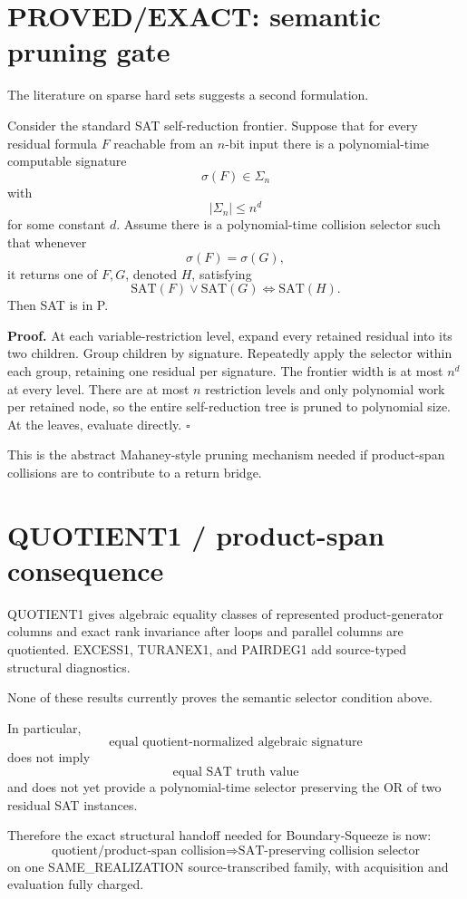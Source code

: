 \documentclass[11pt]{article}
\begin{document}
\section*{PROVED/EXACT: semantic pruning gate}
The literature on sparse hard sets suggests a second formulation.

Consider the standard SAT self-reduction frontier. Suppose that for every residual formula \(F\) reachable from an \(n\)-bit input there is a polynomial-time computable signature
\[
\sigma(F)\in\Sigma_n
\]
with
\[
|\Sigma_n|\le n^{d}
\]
for some constant \(d\). Assume there is a polynomial-time collision selector such that whenever
\[
\sigma(F)=\sigma(G),
\]
it returns one of \(F,G\), denoted \(H\), satisfying
\[
\boxed{
\mathrm{SAT}(F)\vee\mathrm{SAT}(G)
\iff
\mathrm{SAT}(H).
}
\]
Then SAT is in P.

\textbf{Proof.}
At each variable-restriction level, expand every retained residual into its two children. Group children by signature. Repeatedly apply the selector within each group, retaining one residual per signature. The frontier width is at most \(n^d\) at every level. There are at most \(n\) restriction levels and only polynomial work per retained node, so the entire self-reduction tree is pruned to polynomial size. At the leaves, evaluate directly. \(\square\)

This is the abstract Mahaney-style pruning mechanism needed if product-span collisions are to contribute to a return bridge.

\section*{QUOTIENT1 / product-span consequence}
QUOTIENT1 gives algebraic equality classes of represented product-generator columns and exact rank invariance after loops and parallel columns are quotiented. EXCESS1, TURANEX1, and PAIRDEG1 add source-typed structural diagnostics.

None of these results currently proves the semantic selector condition above.

In particular,
\[
\text{equal quotient-normalized algebraic signature}
\]
does not imply
\[
\text{equal SAT truth value}
\]
and does not yet provide a polynomial-time selector preserving the OR of two residual SAT instances.

Therefore the exact structural handoff needed for Boundary-Squeeze is now:
\[
\boxed{
\text{quotient/product-span collision}
\Longrightarrow
\text{SAT-preserving collision selector}
}
\]
on one SAME\_REALIZATION source-transcribed family, with acquisition and evaluation fully charged.
\end{document}
